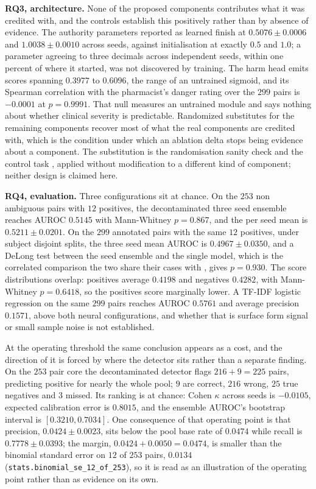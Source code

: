 \textbf{RQ3, architecture.} None of the proposed components contributes what it
was credited with, and the controls establish this positively rather than by
absence of evidence. The authority parameters reported as learned finish at
$0.5076 \pm 0.0006$ and $1.0038 \pm 0.0010$ across seeds, against initialisation
at exactly $0.5$ and $1.0$; a parameter agreeing to three decimals across
independent seeds, within one percent of where it started, was not discovered by
training. The harm head emits scores spanning $0.3977$ to $0.6096$, the range of
an untrained sigmoid, and its Spearman correlation with the pharmacist's danger
rating over the $299$ pairs is $-0.0001$ at $p = 0.9991$. That null measures an
untrained module and says nothing about whether clinical severity is
predictable. Randomized substitutes for the remaining components recover most of
what the real components are credited with, which is the condition under which
an ablation delta stops being evidence about a component. The substitution is
the randomisation sanity check \citep{adebayo2018sanity} and the control task
\citep{hewitt2019control}, applied without modification to a different kind of
component; neither design is claimed here.

\textbf{RQ4, evaluation.} Three configurations sit at chance. On the $253$ non
ambiguous pairs with $12$ positives, the decontaminated three seed ensemble
reaches AUROC $0.5145$ with Mann-Whitney $p = 0.867$, and the per seed mean is
$0.5211 \pm 0.0201$. On the $299$ annotated pairs with the same $12$ positives,
under subject disjoint splits, the three seed mean AUROC is $0.4967 \pm 0.0350$,
and a DeLong test between the seed ensemble and the single model, which is the
correlated comparison the two share their cases with
\citep{delong1988comparing}, gives $p = 0.930$. The score distributions overlap: positives average $0.4198$ and
negatives $0.4282$, with Mann-Whitney $p = 0.6418$, so the positives score
marginally lower. A TF-IDF logistic regression on the same $299$ pairs reaches
AUROC $0.5761$ and average precision $0.1571$, above both neural
configurations, and whether that is surface form signal or small sample noise is
not established.

At the operating threshold the same conclusion appears as a cost, and the
direction of it is forced by where the detector sits rather than a separate
finding. On the $253$ pair core the decontaminated detector flags
$216 + 9 = 225$ pairs, predicting positive for nearly the whole pool; $9$ are
correct, $216$ wrong, $25$ true negatives and $3$ missed. Its ranking is at
chance: Cohen $\kappa$ across seeds is $-0.0105$, expected calibration error is
$0.8015$, and the ensemble AUROC's bootstrap interval is $[0.3210, 0.7034]$.
One consequence of that operating point is that precision, $0.0424 \pm 0.0023$,
sits below the pool base rate of $0.0474$ while recall is
$0.7778 \pm 0.0393$; the margin, $0.0424 + 0.0050 = 0.0474$, is smaller than
the binomial standard error on $12$ of $253$ pairs, $0.0134$
(\texttt{stats.binomial\_se\_12\_of\_253}), so it is read as an illustration of
the operating point rather than as evidence on its own.


